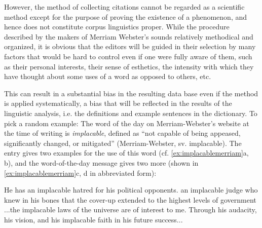 However, the method of collecting citations cannot be regarded as a scientific method except for the purpose of proving the existence of a phenomenon, and hence does not constitute corpus linguistics proper. While the procedure described by the makers of Merriam Webster's sounds relatively methodical and organized, it is obvious that the editors will be guided in their selection by many factors that would be hard to control even if one were fully aware of them, such as their personal interests, their sense of esthetics, the intensity with which they have thought about some uses of a word as opposed to others, etc.

This can result in a substantial bias in the resulting data base even if the method is applied systematically, a bias that will be reflected in the results of the linguistic analysis, i.e. the definitions and example sentences in the dictionary.  To pick a random example: The word of the day on Merriam\hyp{}Webster's website at the time of writing is \textit{implacable}, defined as ``not capable of being appeased, significantly changed, or mitigated'' (Merriam\hyp{}Webster, sv. implacable). The entry gives two examples for the use of this word (cf. \ref{ex:implacablemerriam}a, b), and the word\hyp{}of\hyp{}the\hyp{}day message gives two more (shown in \ref{ex:implacablemerriam}c, d in abbreviated form):

\begin{exe}
\ex
\begin{xlist}
\label{ex:implacablemerriam}
\ex He has an implacable hatred for his political opponents.
\ex an implacable judge who knew in his bones that the cover\hyp{}up extended to the highest levels of government
\ex ...the implacable laws of the universe are of interest to me.
\ex Through his audacity, his vision, and his implacable faith in his future success...
\end{xlist}
\end{exe}

